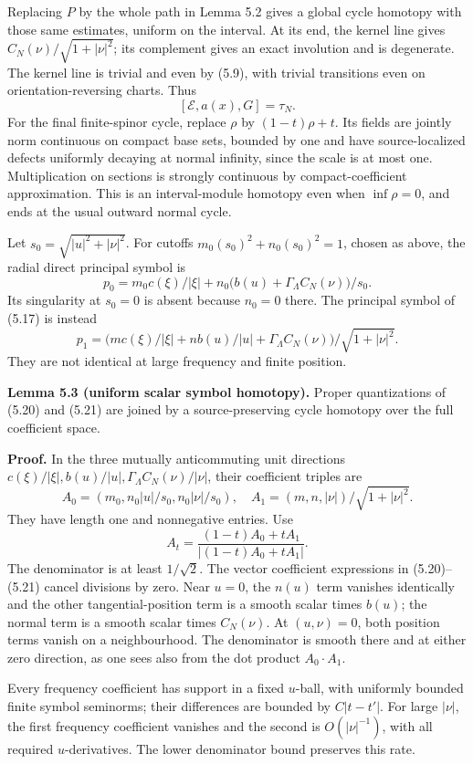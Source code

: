 \documentclass[
  11pt,
]{article}
\begin{document}
Replacing \(P\) by the whole path in Lemma 5.2 gives a global cycle
homotopy with those same estimates, uniform on the interval. At its end,
the kernel line gives \(C_N(\nu)/\sqrt{1+|\nu|^2}\); its complement
gives an exact involution and is degenerate. The kernel line is trivial
and even by (5.9), with trivial transitions even on
orientation-reversing charts. Thus \[
[\mathcal E,a(x),G]=\tau_N.
\tag{5.19}
\] For the final finite-spinor cycle, replace \(\rho\) by
\((1-t)\rho+t\). Its fields are jointly norm continuous on compact base
sets, bounded by one and have source-localized defects uniformly
decaying at normal infinity, since the scale is at most one.
Multiplication on sections is strongly continuous by compact-coefficient
approximation. This is an interval-module homotopy even when
\(\inf\rho=0\), and ends at the usual outward normal cycle.

Let \(s_0=\sqrt{|u|^2+|\nu|^2}\). For cutoffs
\(m_0(s_0)^2+n_0(s_0)^2=1\), chosen as above, the radial direct
principal symbol is \[
p_0=m_0c(\xi)/|\xi|+
n_0\bigl(b(u)+\Gamma_\Lambda C_N(\nu)\bigr)/s_0 .
\tag{5.20}
\] Its singularity at \(s_0=0\) is absent because \(n_0=0\) there. The
principal symbol of (5.17) is instead \[
p_1=\bigl(mc(\xi)/|\xi|+n b(u)/|u|+
\Gamma_\Lambda C_N(\nu)\bigr)/\sqrt{1+|\nu|^2}.
\tag{5.21}
\] They are not identical at large frequency and finite position.

\textbf{Lemma 5.3 (uniform scalar symbol homotopy).} Proper
quantizations of (5.20) and (5.21) are joined by a source-preserving
cycle homotopy over the full coefficient space.

\textbf{Proof.} In the three mutually anticommuting unit directions
\(c(\xi)/|\xi|,b(u)/|u|,\Gamma_\Lambda C_N(\nu)/|\nu|\), their
coefficient triples are \[
A_0=(m_0,n_0|u|/s_0,n_0|\nu|/s_0),\quad
A_1=(m,n,|\nu|)/\sqrt{1+|\nu|^2}.
\tag{5.22}
\] They have length one and nonnegative entries. Use \[
A_t=\frac{(1-t)A_0+tA_1}{|(1-t)A_0+tA_1|}.
\tag{5.23}
\] The denominator is at least \(1/\sqrt2\). The vector coefficient
expressions in (5.20)--(5.21) cancel divisions by zero. Near \(u=0\),
the \(n(u)\) term vanishes identically and the other tangential-position
term is a smooth scalar times \(b(u)\); the normal term is a smooth
scalar times \(C_N(\nu)\). At \((u,\nu)=0\), both position terms vanish
on a neighbourhood. The denominator is smooth there and at either zero
direction, as one sees also from the dot product \(A_0\cdot A_1\).

Every frequency coefficient has support in a fixed \(u\)-ball, with
uniformly bounded finite symbol seminorms; their differences are bounded
by \(C|t-t'|\). For large \(|\nu|\), the first frequency coefficient
vanishes and the second is \(O(|\nu|^{-1})\), with all required
\(u\)-derivatives. The lower denominator bound preserves this rate.
\end{document}
